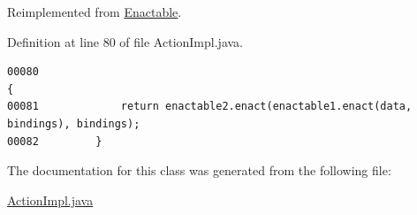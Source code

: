 Reimplemented from \hyperlink{interfaceEnactable_a0}{Enactable}.

Definition at line 80 of file Action\-Impl.java.\footnotesize\begin{verbatim}00080                                                                                    {
00081             return enactable2.enact(enactable1.enact(data, bindings), bindings);
00082         }
\end{verbatim}\normalsize 


The documentation for this class was generated from the following file:\begin{CompactItemize}
\item 
\hyperlink{ActionImpl_8java-source}{Action\-Impl.java}\end{CompactItemize}
